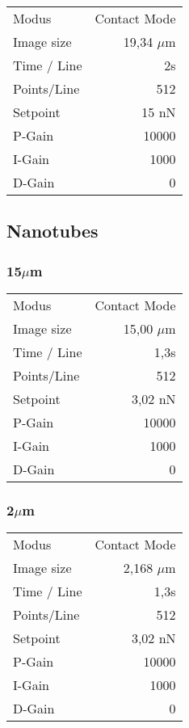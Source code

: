 \begin{center}
    \centering
    \begin{tabular}{l|r}
        Modus & Contact Mode\\
        Image size & 19,34 $\mu$m \\
        Time / Line & 2s \\
        Points/Line & 512\\
        Setpoint & 15 nN \\
        P-Gain & 10000 \\
        I-Gain & 1000 \\
        D-Gain & 0 \\
        
    \end{tabular}
\end{center}

\subsection{Nanotubes}
\subsubsection{15$\mu$m}

\begin{center}
    \centering
    \begin{tabular}{l|r}
        Modus & Contact Mode\\
        Image size & 15,00 $\mu$m \\
        Time / Line & 1,3s \\
        Points/Line & 512\\
        Setpoint & 3,02 nN \\
        P-Gain & 10000 \\
        I-Gain & 1000 \\
        D-Gain & 0 \\
        
    \end{tabular}
\end{center}

\subsubsection{2$\mu$m}

\begin{center}
    \centering
    \begin{tabular}{l|r}
        Modus & Contact Mode\\
        Image size & 2,168 $\mu$m \\
        Time / Line & 1,3s \\
        Points/Line & 512\\
        Setpoint & 3,02 nN \\
        P-Gain & 10000 \\
        I-Gain & 1000 \\
        D-Gain & 0 \\
        
    \end{tabular}
\end{center}

